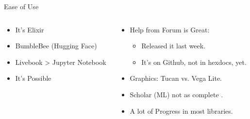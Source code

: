 
\begin{frame}{Ease of Use}
	\begin{columns}
	\begin{column}{0.50\textwidth}
		\begin{tcolorbox}[enhanced jigsaw, colback=white, opacityback=.4, colframe=ElixirPurple, arc=3mm, boxrule=0mm, height=0.8\textheight, valign=center, title=The Good]

			
			\begin{itemize}
				\item It's Elixir
				\item BumbleBee (Hugging Face)
				\item Livebook > Jupyter Notebook
				\item It's Possible
				
			\end{itemize}

		\end{tcolorbox}
	\end{column}
	
	\begin{column}{0.6\textwidth}
		\begin{tcolorbox}[enhanced jigsaw, colback=white, opacityback=.4, colframe=ElixirPurple, arc=3mm, boxrule=0mm, height=0.8\textheight, valign=center, title=The Enhancing]
			
			\begin{itemize}
				\item Help from Forum is Great:
				\begin{itemize}
					\item Released it last week.
					\item It's on Github, not in hexdocs, yet.
				\end{itemize}
				\item Graphics: Tucan vs. Vega Lite.
				\item Scholar (ML) not as complete .
				\item A lot of Progress in most libraries.
			\end{itemize}

		\end{tcolorbox}
	\end{column}
	\end{columns}
\end{frame}